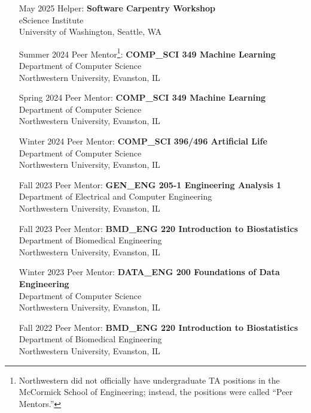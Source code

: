 \documentclass{article}
\begin{document}
\begin{itemize}[leftmargin=1.5in]
    \item[May 2025] Helper: \textbf{Software Carpentry Workshop}\\
    eScience Institute\\
    University of Washington, Seattle, WA
    \item[Summer 2024] Peer Mentor\footnote{Northwestern did not officially have undergraduate TA positions in the McCormick School of Engineering; instead, the positions were called ``Peer Mentors.''}: \textbf{COMP\_SCI 349 Machine Learning}\\
    Department of Computer Science\\
    Northwestern University, Evanston, IL
    \item[Spring 2024] Peer Mentor: \textbf{COMP\_SCI 349 Machine Learning}\\
    Department of Computer Science\\
    Northwestern University, Evanston, IL
    \item[Winter 2024] Peer Mentor: \textbf{COMP\_SCI 396/496 Artificial Life}\\
    Department of Computer Science\\
    Northwestern University, Evanston, IL
    \item[Fall 2023] Peer Mentor: \textbf{GEN\_ENG 205-1 Engineering Analysis 1}\\
    Department of Electrical and Computer Engineering\\
    Northwestern University, Evanston, IL
    \item[Fall 2023] Peer Mentor: \textbf{BMD\_ENG 220 Introduction to Biostatistics}\\
    Department of Biomedical Engineering\\
    Northwestern University, Evanston, IL
    \item[Winter 2023] Peer Mentor: \textbf{DATA\_ENG 200 Foundations of Data Engineering}\\
    Department of Computer Science\\
    Northwestern University, Evanston, IL
    \item[Fall 2022] Peer Mentor: \textbf{BMD\_ENG 220 Introduction to Biostatistics}\\
    Department of Biomedical Engineering\\
    Northwestern University, Evanston, IL
\end{itemize}
\end{document}
